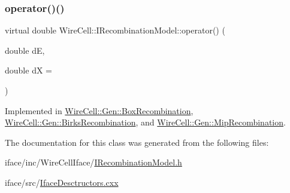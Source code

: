 \subsubsection{\texorpdfstring{operator()()}{operator()()}}
{\footnotesize\ttfamily virtual double Wire\+Cell\+::\+I\+Recombination\+Model\+::operator() (\begin{DoxyParamCaption}\item[{double}]{dE,  }\item[{double}]{dX = {} }\end{DoxyParamCaption})\hspace{0.3cm}{\ttfamily [pure virtual]}}



Implemented in \hyperlink{class_wire_cell_1_1_gen_1_1_box_recombination_a9a7af321804662d507787c83b40dc1cb}{Wire\+Cell\+::\+Gen\+::\+Box\+Recombination}, \hyperlink{class_wire_cell_1_1_gen_1_1_birks_recombination_afc95474baf06138cf5d52245137a5fd8}{Wire\+Cell\+::\+Gen\+::\+Birks\+Recombination}, and \hyperlink{class_wire_cell_1_1_gen_1_1_mip_recombination_a894a0a8bfb306444d2cecfb3340e35c9}{Wire\+Cell\+::\+Gen\+::\+Mip\+Recombination}.



The documentation for this class was generated from the following files\+:\begin{DoxyCompactItemize}
\item 
iface/inc/\+Wire\+Cell\+Iface/\hyperlink{_i_recombination_model_8h}{I\+Recombination\+Model.\+h}\item 
iface/src/\hyperlink{_iface_desctructors_8cxx}{Iface\+Desctructors.\+cxx}\end{DoxyCompactItemize}
